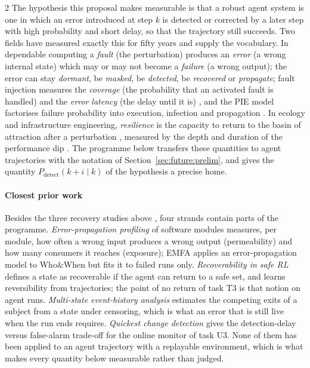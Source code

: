 \begin{multicols}{2}
The hypothesis this proposal makes measurable is that a robust agent system is one in which an error introduced at step $k$ is detected or corrected by a later step with high probability and short delay, so that the trajectory still succeeds. Two fields have measured exactly this for fifty years and supply the vocabulary. In dependable computing \cite{avizienis2004dependability} a \emph{fault} (the perturbation) produces an \emph{error} (a wrong internal state) which may or may not become a \emph{failure} (a wrong output); the error can stay \emph{dormant}, be \emph{masked}, be \emph{detected}, be \emph{recovered} or \emph{propagate}; fault injection measures the \emph{coverage} (the probability that an activated fault is handled) and the \emph{error latency} (the delay until it is) \cite{arlat1990fault,powell1995coverage}, and the PIE model factorises failure probability into execution, infection and propagation \cite{voas1992pie}. In ecology and infrastructure engineering, \emph{resilience} is the capacity to return to the basin of attraction after a perturbation \cite{holling1973resilience}, measured by the depth and duration of the performance dip \cite{bruneau2003resilience}. The programme below transfers these quantities to agent trajectories with the notation of Section~\ref{sec:future:prelim}, and gives the quantity $P_{\mathrm{detect}}(k{+}i\mid k)$ of the hypothesis a precise home.

\paragraph{Closest prior work} Besides the three recovery studies above \cite{huang2024resilience,jamshidi2026cascade,zhu2026toolmaze}, four strands contain parts of the programme. \emph{Error-propagation profiling} of software modules \cite{hiller2004epic} measures, per module, how often a wrong input produces a wrong output (permeability) and how many consumers it reaches (exposure); EMFA \cite{liao2026emfa} applies an error-propagation model to Who\&When but fits it to failed runs only. \emph{Recoverability in safe RL} \cite{moldovan2012safe,grinsztajn2021reversibility} defines a state as recoverable if the agent can return to a safe set, and learns reversibility from trajectories; the point of no return of task T3 is that notion on agent runs. \emph{Multi-state event-history analysis} \cite{putter2007multistate,andersen1982cox,aalen1978empirical} estimates the competing exits of a subject from a state under censoring, which is what an error that is still live when the run ends requires. \emph{Quickest change detection} \cite{page1954cusum,lorden1971,tartakovsky2014sequential} gives the detection-delay versus false-alarm trade-off for the online monitor of task U3. None of them has been applied to an agent trajectory with a replayable environment, which is what makes every quantity below measurable rather than judged.


\end{multicols}

